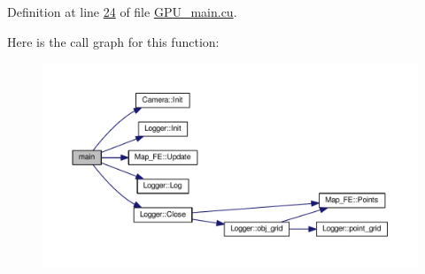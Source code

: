 Definition at line \hyperlink{GPU__main_8cu_source_l00024}{24} of file \hyperlink{GPU__main_8cu_source}{G\+P\+U\+\_\+main.\+cu}.



Here is the call graph for this function\+:\nopagebreak
\begin{figure}[H]
\begin{center}
\leavevmode
\includegraphics[width=350pt]{GPU__main_8cu_abf9e6b7e6f15df4b525a2e7705ba3089_cgraph}
\end{center}
\end{figure}


